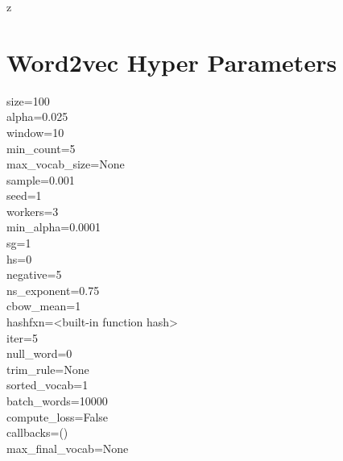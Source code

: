 \documentclass[../embeddings.tex]{subfiles}
\begin{document}
z

\section{Word2vec Hyper Parameters}

    size=100\\
    alpha=0.025\\
    window=10\\
    min\_count=5\\
    max\_vocab\_size=None\\
    sample=0.001\\
    seed=1\\
    workers=3\\
    min\_alpha=0.0001\\
    sg=1\\
    hs=0\\
    negative=5\\
    ns\_exponent=0.75\\
    cbow\_mean=1\\
    hashfxn=<built-in function hash>\\
    iter=5\\
    null\_word=0\\
    trim\_rule=None\\
    sorted\_vocab=1\\
    batch\_words=10000\\
    compute\_loss=False\\
    callbacks=()\\
    max\_final\_vocab=None\\
\end{document}
